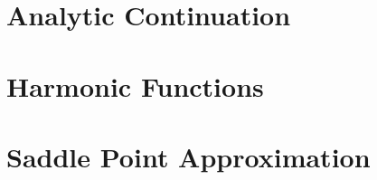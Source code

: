 \documentclass[../mmf.tex]{subfiles}
\begin{document}
\section{Analytic Continuation}
\section{Harmonic Functions}
\section{Saddle Point Approximation}
\end{document}
